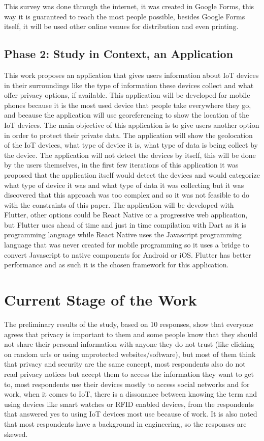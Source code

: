 \documentclass[conference]{IEEEtran}
\begin{document}
This survey was done through the internet, it was created in Google Forms,
this way it is guaranteed to reach the most people possible, besides Google
Forms itself, it will be used other online venues for distribution and even printing.

\subsection{Phase 2: Study in Context, an Application}

This work proposes an application that gives users information about IoT
devices in their surroundings like the type of information these devices
collect and what offer privacy options, if available. This application will
be developed for mobile phones because it is the most used device that people take
everywhere they go, and because the application will use georeferencing to show the
location of the IoT devices. The main objective of this application is to give users
another option in order to protect their private data.
The application will show the geolocation of the IoT devices, what type of device it is,
what type of data is being collect by the device. The application will not detect the
devices by itself, this will be done by the users themselves, in the first few iterations
of this application it was proposed that the application itself would detect the
devices and would categorize what type of device it was and what type of data it
was collecting but it was discovered that this approach was too complex and so it was
not feasible to do with the constraints of this paper.
The application will be developed with Flutter, other options could be React Native or
a progressive web application, but Flutter uses ahead of time and just in time compilation
with Dart as it is programming language while React Native uses the Javascript programming
language that was never created for mobile programming so it uses a bridge to convert
Javascript to native components for Android or iOS. Flutter has better performance and
as such it is the chosen framework for this application.

\section{Current Stage of the Work}

The preliminary results of the study, based on 10 responses, show that everyone agrees that
privacy is important to them and some people know that they should not share their
personal information with anyone they do not trust (like clicking on random urls or using
unprotected websites/software), but most of them think that privacy and security are the
same concept, most respondents also do not read privacy notices but accept them to access
the information they want to get to, most respondents use their devices mostly to access
social networks and for work, when it comes to IoT, there is a dissonance between knowing
the term and using devices like smart watches or RFID enabled devices, from the respondents
that answered yes to using IoT devices most use because of work. It is also noted that most
respondents have a background in engineering, so the responses are skewed.
\end{document}
